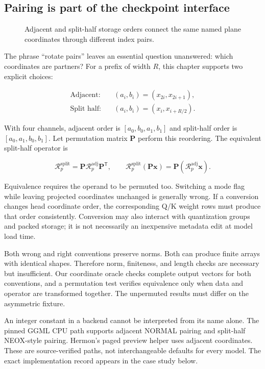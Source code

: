 \documentclass[
  10pt,
]{article}
\begin{document}
\subsection{Pairing is part of the checkpoint
interface}\label{pairing-is-part-of-the-checkpoint-interface}

\begin{figure}[H]\centering\resizebox{\linewidth}{!}{}\caption{Adjacent and split-half storage orders connect the same named plane coordinates through different index pairs.}\end{figure}

The phrase ``rotate pairs'' leaves an essential question unanswered:
which coordinates are partners? For a prefix of width \(R\), this
chapter supports two explicit choices:

\[
\begin{aligned}
\text{Adjacent:}\quad &(a_i,b_i)=(x_{2i},x_{2i+1}),\\
\text{Split half:}\quad &(a_i,b_i)=(x_i,x_{i+R/2}).
\end{aligned}
\]

With four channels, adjacent order is \([a_0,b_0,a_1,b_1]\) and
split-half order is \([a_0,a_1,b_0,b_1]\). Let permutation matrix
\(\mathbf{P}\) perform this reordering. The equivalent split-half
operator is

\[
\mathcal{R}^{\mathrm{split}}_p
=\mathbf{P}\mathcal{R}^{\mathrm{adj}}_p\mathbf{P}^{\mathsf T},\qquad
\mathcal{R}^{\mathrm{split}}_p(\mathbf{P}\mathbf{x})
=\mathbf{P}(\mathcal{R}^{\mathrm{adj}}_p\mathbf{x}).
\]

Equivalence requires the operand to be permuted too. Switching a mode
flag while leaving projected coordinates unchanged is generally wrong.
If a conversion changes head coordinate order, the corresponding Q/K
weight rows must produce that order consistently. Conversion may also
interact with quantization groups and packed storage; it is not
necessarily an inexpensive metadata edit at model load time.

Both wrong and right conventions preserve norms. Both can produce finite
arrays with identical shapes. Therefore norm, finiteness, and length
checks are necessary but insufficient. Our coordinate oracle checks
complete output vectors for both conventions, and a permutation test
verifies equivalence only when data and operator are transformed
together. The unpermuted results must differ on the asymmetric fixture.

An integer constant in a backend cannot be interpreted from its name
alone. The pinned GGML CPU path supports adjacent NORMAL pairing and
split-half NEOX-style pairing. Hermon's paged preview helper uses
adjacent coordinates. These are source-verified paths, not
interchangeable defaults for every model. The exact implementation
record appears in the case study below.
\end{document}
